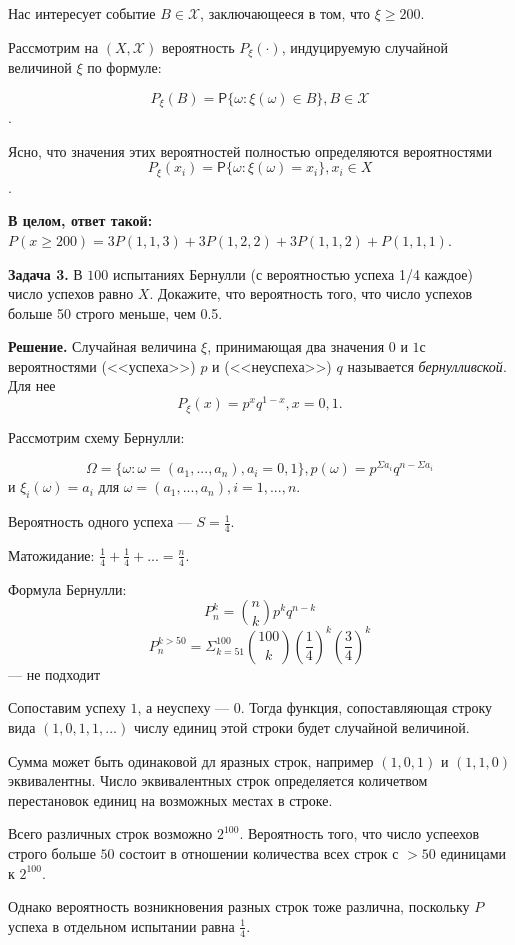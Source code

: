 \documentclass{article}
\begin{document}
Нас интересует событие $B\in \mathcal{X}$, заключающееся в том, что $\xi \ge 200$.

Рассмотрим на $(X, \mathcal{X})$ вероятность $P_\xi(\cdot)$, индуцируемую случайной величиной $\xi$ по формуле:

$$
P_\xi(B)=\mathsf{P}\{\omega: \xi(\omega)\in B\}, B\in\mathcal{X}$$.

Ясно, что значения этих вероятностей полностью определяются вероятностями
$$P_\xi(x_i)=\mathsf{P}\{\omega: \xi(\omega)=x_i\}, x_i\in{X}$$\cite[56]{sh}.


\textbf{В целом, ответ такой:} 
$P(x\geqslant200)=3P(1,1,3)+3P(1,2,2)+3P(1,1,2)+P(1,1,1)$.

\textbf{Задача 3.} 
В $100$ испытаниях Бернулли (с вероятностью успеха 1/4 каждое) число успехов равно $X$. Докажите, что вероятность того, что число успехов больше 50 строго меньше, чем 0.5.

\textbf{Решение.}
Случайная величина $\xi$, принимающая два значения $0$ и $1$с вероятностями (<<успеха>>) $p$ и (<<неуспеха>>) $q$ называется \textit{бернулливской}\cite[57]{sh}.
Для нее
$$P_\xi(x)=p^xq^{1-x}, x=0,1.$$\cite[57,1]{sh}

Рассмотрим схему Бернулли:

$$\Omega = \{\omega: \omega=(a_1,..., a_n), a_i=0,1\}, 
p(\omega)=p^{\Sigma{a_i}}q^{n-\Sigma{a_i}}$$
и $\xi_i(\omega)=a_i$ для $\omega=(a_1,...,a_n), i=1,...,n$\cite[59]{sh}.


Вероятность одного успеха --- $S=\frac{1}{4}$.

Матожидание: $\frac{1}{4}+\frac{1}{4}+...=\frac{n}{4}$.

Формула Бернулли:
$$P_n^k=\binom{n}{k}p^kq^{n-k}$$
$$P_n^{k>50}=\Sigma_{k=51}^{100} \binom{100}{k}(\frac{1}{4})^k(\frac{3}{4})^k$$
--- не подходит


Сопоставим успеху $1$, а неуспеху --- $0$. Тогда функция, сопоставляющая строку вида $(1,0,1,1,...)$ числу единиц этой строки будет случайной величиной. 

Сумма может быть одинаковой дл яразных строк, например $(1,0,1)$ и $(1,1,0)$ эквивалентны. 
Число эквивалентных строк определяется количетвом перестановок единиц на возможных местах в строке. 

Всего различных строк возможно $2^{100}$. Вероятность того, что число успеехов строго больше $50$ состоит в отношении количества всех строк с $>50$ единицами к $2^{100}$. 

Однако вероятность возникновения разных строк тоже различна, поскольку $P$ успеха в отдельном испытании равна $\frac{1}{4}$.
\end{document}

